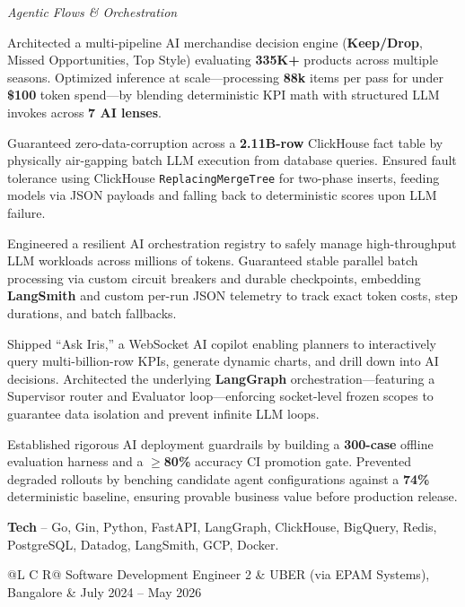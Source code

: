 \textcolor{Project}{\textit{Agentic Flows \& Orchestration}}
\vspace{-0.8ex}
\begin{zitemize}
    \item Architected a multi-pipeline AI merchandise decision engine (\textbf{Keep/Drop}, Missed Opportunities, Top Style) evaluating \textbf{335K+} products across multiple seasons. Optimized inference at scale---processing \textbf{88k} items per pass for under \textbf{\$100} token spend---by blending deterministic KPI math with structured LLM invokes across \textbf{7 AI lenses}.
    \item Guaranteed zero-data-corruption across a \textbf{2.11B-row} ClickHouse fact table by physically air-gapping batch LLM execution from database queries. Ensured fault tolerance using ClickHouse \texttt{ReplacingMergeTree} for two-phase inserts, feeding models via JSON payloads and falling back to deterministic scores upon LLM failure.
    \item Engineered a resilient AI orchestration registry to safely manage high-throughput LLM workloads across millions of tokens. Guaranteed stable parallel batch processing via custom circuit breakers and durable checkpoints, embedding \textbf{LangSmith} and custom per-run JSON telemetry to track exact token costs, step durations, and batch fallbacks.
    \item Shipped ``Ask Iris,'' a WebSocket AI copilot enabling planners to interactively query multi-billion-row KPIs, generate dynamic charts, and drill down into AI decisions. Architected the underlying \textbf{LangGraph} orchestration---featuring a Supervisor router and Evaluator loop---enforcing socket-level frozen scopes to guarantee data isolation and prevent infinite LLM loops.
    \item Established rigorous AI deployment guardrails by building a \textbf{300-case} offline evaluation harness and a $\geq$\textbf{80\%} accuracy CI promotion gate. Prevented degraded rollouts by benching candidate agent configurations against a \textbf{74\%} deterministic baseline, ensuring provable business value before production release.
    \item \textbf{Tech} -- Go, Gin, Python, FastAPI, LangGraph, ClickHouse, BigQuery, Redis, PostgreSQL, Datadog, LangSmith, GCP, Docker.
\end{zitemize}

\noindent
\begin{tabularx}{\textwidth}{@{}L C R@{}}
\textcolor{role}{Software Development Engineer 2} & \textcolor{company}{UBER (via EPAM Systems), Bangalore} & \textcolor{date}{July 2024 -- May 2026}\\
\end{tabularx}
\vspace{-1.6ex}

